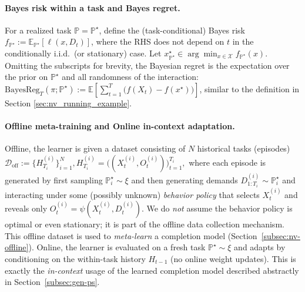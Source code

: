 \documentclass[11pt]{article}
\renewcommand{\P}{\mathbb{P}}
\providecommand{\E}{\mathbb{E}}
\providecommand{\BReg}{\mathrm{BayesReg}}
\providecommand{\cD}{\mathcal{D}}
\providecommand{\cX}{\mathcal{X}}
\begin{document}
\paragraph{Bayes risk within a task and Bayes regret.}
For a realized task $\P=\P^\star$, define the (task-conditional) Bayes risk $f_{\P^\star} := \E_{\P^\star}\!\left[\ell(x,D_t)\right]$, where the RHS does not depend on $t$ in the conditionally i.i.d.\ (or stationary) case.
Let $x_{\P^\star}^\star\in\arg\min_{x\in\cX} f_{\P^\star}(x)$. Omitting the subscripts for brevity, the Bayesian regret is the expectation over the prior on $\P^\star$ and all randomness of the interaction:
\(
\BReg_T(\pi;\P^\star)
:= \E\!\left[\sum_{t=1}^T \bigl(f(X_t)-f(x^\star)\bigr)\right]
\), similar to the definition in Section \ref{sec:nv_running_example}.

\paragraph{Offline meta-training and Online in-context adaptation.}
Offline, the learner is given a dataset consisting of $N$ historical tasks (episodes)
\(\cD_{\mathrm{off}} := \bigl\{ H^{(i)}_{T_i} \bigr\}_{i=1}^N, H^{(i)}_{T_i} = \bigl((X^{(i)}_t, O^{(i)}_t)\bigr)_{t=1}^{T_i},\)
where each episode is generated by first sampling $\P^{\star}_i\sim \xi$ and then generating demands
$D^{(i)}_{1:T_i}\sim \P^{\star}_i$ and interacting under some (possibly unknown) \emph{behavior policy}
that selects $X^{(i)}_t$ and reveals only $O^{(i)}_t=\psi(X^{(i)}_t,D^{(i)}_t)$.
We do \emph{not} assume the behavior policy is optimal or even stationary; it is part of the offline data
collection mechanism. This offline dataset is used to \emph{meta-learn} a completion model (Section~\ref{subsec:nv-offline}). Online, the learner is evaluated on a fresh task $\P^\star \sim \xi$ and adapts by conditioning on the
within-task history $H_{t-1}$ (no online weight updates). This is exactly the \emph{in-context} usage
of the learned completion model described abstractly in Section~\ref{subsec:gen-ps}.
\end{document}
